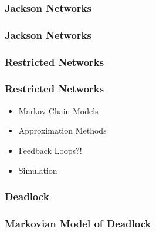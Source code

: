 \documentclass{beamer}
\begin{document}

\begin{frame}
  \frametitle{Jackson Networks}
  \begin{figure}
  
  \end{figure}
\end{frame}
\begin{frame}
  \frametitle{Jackson Networks}
  \begin{figure}
  
  \end{figure}
\end{frame}

\begin{frame}
  \frametitle{Restricted Networks}
  \begin{figure}
  
  \end{figure}
\end{frame}

\begin{frame}
  \frametitle{Restricted Networks}
  \begin{itemize}
    \item<1-> Markov Chain Models
    \item<2-> Approximation Methods
    \item<3-> Feedback Loops?!
    \item<4-> Simulation
  \end{itemize}
\end{frame}



\begin{frame}
    \frametitle{Deadlock}
    \begin{figure}
    
    \end{figure}
\end{frame}

\begin{frame}
    \begin{figure}
    
    \end{figure}
\end{frame}


\begin{frame}
    \frametitle{Markovian Model of Deadlock}
    \newline
\end{frame}
\end{document}
